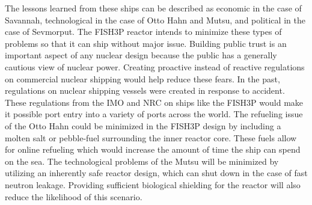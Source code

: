 \documentclass[12pt]{article}
\begin{document}
The lessons learned from these ships can be described as economic in the case of Savannah, technological in the case of Otto Hahn and Mutsu, and political in the case of Sevmorput.  The FISH3P reactor intends to minimize these types of problems so that it can ship without major issue.  Building public trust is an important aspect of any nuclear design because the public has a generally cautious view of nuclear power.  Creating proactive instead of reactive regulations on commercial nuclear shipping would help reduce these fears.  In the past, regulations on nuclear shipping vessels were created in response to accident.  These regulations from the IMO and NRC on ships like the FISH3P would make it possible port entry into a variety of ports across the world.  The refueling issue of the Otto Hahn could be minimized in the FISH3P design by including a molten salt or pebble-fuel surrounding the inner reactor core.  These fuels allow for online refueling which would increase the amount of time the ship can spend on the sea.  The technological problems of the Mutsu will be minimized by utilizing an inherently safe reactor design, which can shut down in the case of fast neutron leakage.  Providing sufficient biological shielding for the reactor will also reduce the likelihood of this scenario.



\end{document}

